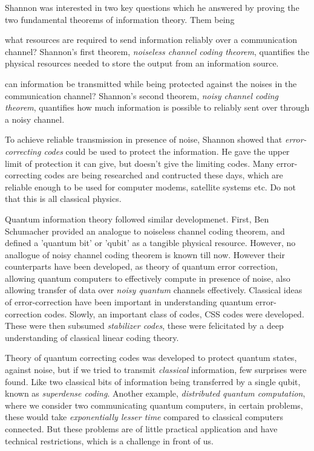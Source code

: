 Shannon was interested in two key questions which he answered by proving the two fundamental theorems of information theory. Them being
\begin{enumerate*}[label=(\alph*)]
    \item what resources are required to send information reliably over a communication channel? Shannon's first theorem, \textit{noiseless channel coding theorem}, quantifies the physical resources needed to store the output from an information source.
    \item can information be transmitted while being protected against the noises in the communication channel? Shannon's second theorem, \textit{noisy channel coding theorem}, quantifies how much information is possible to reliably sent over through a noisy channel.
\end{enumerate*}
To achieve reliable transmission in presence of noise, Shannon showed that \textit{error-correcting codes} could be used to protect the information. He gave the upper limit of protection it can give, but doesn't give the limiting codes. Many error-correcting codes are being researched and contructed these days, which are reliable enough to be used for computer modems, satellite systems etc. Do not that this is all classical physics.

Quantum information theory followed similar developmenet. First, Ben Schumacher provided an analogue to noiseless channel coding theorem, and defined a 'quantum bit' or 'qubit' as a tangible physical resource. However, no anallogue of noisy channel coding theorem is known till now. However their counterparts have been developed, as theory of quantum error correction, allowing quantum computers to effectively compute in presence of noise, also allowing transfer of data over \textit{noisy quantum} channels effectively. Classical ideas of error-correction have been important in understanding quantum error-correction codes. Slowly, an important class of codes, CSS codes were developed. These were then subsumed \textit{stabilizer codes}, these were felicitated by a deep understanding of classical linear coding theory.

Theory of quantum correcting codes was developed to protect quantum states, against noise, but if we tried to transmit \textit{classical} information, few surprises were found. Like two classical bits of information being transferred by a single qubit, known as \textit{superdense coding}. Another example, \textit{distributed quantum computation}, where we consider two communicating quantum computers, in certain problems, these would take \textit{exponentially lesser time} compared to classical computers connected. But these problems are of little practical application and have technical restrictions, which is a challenge in front of us.


